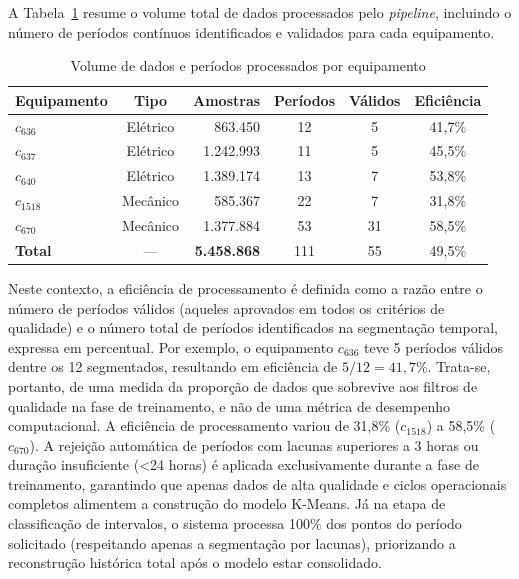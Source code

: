 A Tabela~\ref{tab:volume_dados} resume o volume total de dados processados pelo \textit{pipeline}, incluindo o número de períodos contínuos identificados e validados para cada equipamento.

\begin{table}[H]
    \centering
    \caption{Volume de dados e períodos processados por equipamento}
    \label{tab:volume_dados}
    \begin{tabular}{|l|c|r|c|c|c|}
        \hline
        \textbf{Equipamento} & \textbf{Tipo} & \textbf{Amostras}  & \textbf{Períodos} & \textbf{Válidos} & \textbf{Eficiência} \\
        \hline
        $c_{636}$            & Elétrico      & 863.450            & 12                & 5                & 41,7\%              \\
        $c_{637}$            & Elétrico      & 1.242.993          & 11                & 5                & 45,5\%              \\
        $c_{640}$            & Elétrico      & 1.389.174          & 13                & 7                & 53,8\%              \\
        $c_{1518}$           & Mecânico      & 585.367            & 22                & 7                & 31,8\%              \\
        $c_{670}$            & Mecânico      & 1.377.884          & 53                & 31               & 58,5\%              \\
        \hline
        \textbf{Total}       & ---           & \textbf{5.458.868} & 111               & 55               & 49,5\%              \\
        \hline
    \end{tabular}
\end{table}

Neste contexto, a eficiência de processamento é definida como a razão entre o número de períodos válidos (aqueles aprovados em todos os critérios de qualidade) e o número total de períodos identificados na segmentação temporal, expressa em percentual. Por exemplo, o equipamento $c_{636}$ teve 5 períodos válidos dentre os 12 segmentados, resultando em eficiência de $5/12 = 41{,}7\%$. Trata-se, portanto, de uma medida da proporção de dados que sobrevive aos filtros de qualidade na fase de treinamento, e não de uma métrica de desempenho computacional. A eficiência de processamento variou de 31,8\% ($c_{1518}$) a 58,5\% ($c_{670}$). A rejeição automática de períodos com lacunas superiores a 3 horas ou duração insuficiente (\textless 24 horas) é aplicada exclusivamente durante a fase de treinamento, garantindo que apenas dados de alta qualidade e ciclos operacionais completos alimentem a construção do modelo K-Means. Já na etapa de classificação de intervalos, o sistema processa 100\% dos pontos do período solicitado (respeitando apenas a segmentação por lacunas), priorizando a reconstrução histórica total após o modelo estar consolidado.

